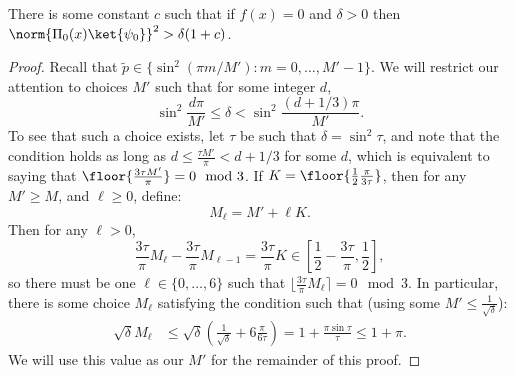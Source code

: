 \documentclass{toc}
\begin{document}
\begin{claim}
There is some constant $c$ such that if $f(x)=0$ and $\delta>0$ then $\norm{\Pi_0(x)\ket{\psi_0}}^2>\delta(1+c)$. 
\end{claim}
\begin{proof}
Recall that $\tilde p\in \{\sin^2(\pi m/M'): m=0,\dots, M'-1\}$. We will restrict our attention to choices $M'$ such that for some integer $d$,
$$\sin^2\frac{d\pi}{M'}\leq \delta < \sin^2\frac{(d+1/3)\pi}{M'}.$$
To see that such a choice exists, let ${\tau}$ be such that $\delta=\sin^2\tau$, and note that the condition holds as long as $d\leq \frac{\tau M'}{\pi}< d+1/3$ for some $d$, which is equivalent to saying that $\floor{\frac{3\tau M'}{\pi}} = 0\mod 3$. If $K=\floor{\frac{1}{2}\frac{\pi}{3\tau}}$, then for any $M'\geq M$, and $\ell\geq 0$, define:
$$M_{\ell} = M'+\ell K.$$
Then for any $\ell>0$, 
$$\frac{3\tau}{\pi}M_{\ell} - \frac{3\tau}{\pi}M_{\ell-1} = \frac{3\tau}{\pi}K\in \left[\frac{1}{2}-\frac{3\tau}{\pi},\frac{1}{2}\right],$$
so there must be one $\ell\in \{0,\dots,6\}$ such that $\lfloor \frac{3\tau}{\pi}M_{\ell} \rceil = 0\mod 3$. 
In particular, there is some choice $M_\ell$ satisfying the condition such that (using some $M'\leq \frac{1}{\sqrt{\delta}}$):
\begin{align}
\sqrt{\delta} M_{\ell} &\leq \sqrt{\delta}\left(\frac{1}{\sqrt{\delta}}+6\frac{\pi}{6\tau}\right)
= 1+\frac{\pi\sin\tau}{\tau}
\leq 1+\pi.\label{eq:M-ell}
\end{align}
We will use this value as our $M'$ for the remainder of this proof. 


\end{proof}
\end{document}
